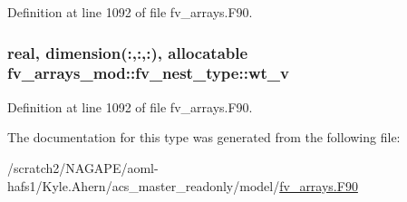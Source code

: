 Definition at line 1092 of file fv\-\_\-arrays.\-F90.

\subsubsection[{wt\-\_\-v}]{\setlength{\rightskip}{0pt plus 5cm}real, dimension(\-:,\-:,\-:), allocatable fv\-\_\-arrays\-\_\-mod\-::fv\-\_\-nest\-\_\-type\-::wt\-\_\-v}\label{structfv__arrays__mod_1_1fv__nest__type_a987a44e252646188a908d61432fba24a}


Definition at line 1092 of file fv\-\_\-arrays.\-F90.



The documentation for this type was generated from the following file\-:\begin{DoxyCompactItemize}
\item 
/scratch2/\-N\-A\-G\-A\-P\-E/aoml-\/hafs1/\-Kyle.\-Ahern/acs\-\_\-master\-\_\-readonly/model/\hyperlink{fv__arrays_8F90}{fv\-\_\-arrays.\-F90}\end{DoxyCompactItemize}
